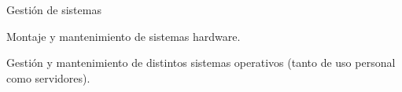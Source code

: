 \begin{cventries}
\cventry%
	{} %
	{Gestión de sistemas} %
	{} %
	{} %
	{%
		\begin{cvitems} %
			\item
				Montaje y mantenimiento de sistemas hardware.
			\item
				Gestión y mantenimiento de distintos sistemas operativos (tanto de uso personal como servidores).
		\end{cvitems}
	}


\end{cventries}
